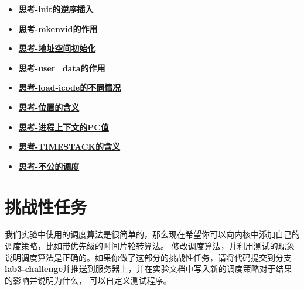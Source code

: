 \begin{itemize}
\item \hyperref[think-env_init]{\textbf{\textcolor{baseB}{思考-init的逆序插入}}}
\item \hyperref[think-mkenvid]{\textbf{\textcolor{baseB}{思考-mkenvid的作用}}}
\item \hyperref[think-env_setup_vm]{\textbf{\textcolor{baseB}{思考-地址空间初始化}}}
\item \hyperref[think-user-data]{\textbf{\textcolor{baseB}{思考-user\_data的作用}}}
\item \hyperref[think-load-icode]{\textbf{\textcolor{baseB}{思考-load-icode的不同情况}}}
\item \hyperref[think-位置]{\textbf{\textcolor{baseB}{思考-位置的含义}}}
\item \hyperref[think-pc]{\textbf{\textcolor{baseB}{思考-进程上下文的PC值}}}
\item \hyperref[think-TIMESTACK]{\textbf{\textcolor{baseB}{思考-TIMESTACK的含义}}}
\item \hyperref[think-调度]{\textbf{\textcolor{baseB}{思考-不公的调度}}}
\end{itemize}

\section{挑战性任务}
我们实验中使用的调度算法是很简单的，那么现在希望你可以向内核中添加自己的调度策略，比如带优先级的时间片轮转算法。
修改调度算法，并利用测试的现象说明调度算法是正确的。如果你做了这部分的挑战性任务，请将代码提交到分支
\textbf{lab3-challenge}并推送到服务器上，并在实验文档中写入新的调度策略对于结果的影响并说明为什么，
可以自定义测试程序。
